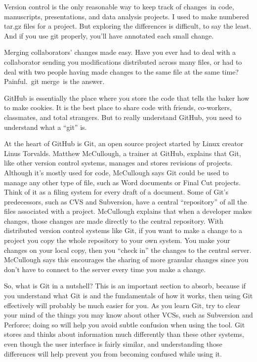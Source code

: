 Version control is the only reasonable way to keep track of changes in code, manuscripts, presentations, and data analysis projects. I used to make numbered tar.gz files for a project. But exploring the differences is difficult, to say the least. And if you use git properly, you’ll have annotated each small change.

Merging collaborators’ changes made easy. Have you ever had to deal with a collaborator sending you modifications distributed across many files, or had to deal with two people having made changes to the same file at the same time? Painful. git merge is the answer.

GitHub is essentially the place where you store the code that tells the baker how to make cookies. It is the best place to share code with friends, co-workers, classmates, and total strangers. But to really understand GitHub, you need to understand what a “git” is.

At the heart of GitHub is Git, an open source project started by Linux creator Linus Torvalds. Matthew McCullough, a trainer at GitHub, explains that Git, like other version control systems, manages and stores revisions of projects. Although it’s mostly used for code, McCullough says Git could be used to manage any other type of file, such as Word documents or Final Cut projects. Think of it as a filing system for every draft of a document. Some of Git’s predecessors, such as CVS and Subversion, have a central “repository” of all the files associated with a project. McCullough explains that when a developer makes changes, those changes are made directly to the central repository. With distributed version control systems like Git, if you want to make a change to a project you copy the whole repository to your own system. You make your changes on your local copy, then you “check in” the changes to the central server. McCullough says this encourages the sharing of more granular changes since you don’t have to connect to the server every time you make a change.

So, what is Git in a nutshell? This is an important section to absorb, because if you understand what Git is and the fundamentals of how it works, then using Git effectively will probably be much easier for you. As you learn Git, try to clear your mind of the things you may know about other VCSs, such as Subversion and Perforce; doing so will help you avoid subtle confusion when using the tool. Git stores and thinks about information much differently than these other systems, even though the user interface is fairly similar, and understanding those differences will help prevent you from becoming confused while using it.

